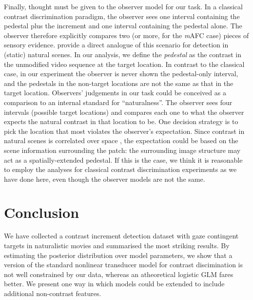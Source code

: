 \documentclass[11pt,a4paper]{article}
\begin{document}
{Finally, thought must be given to the observer model for our task.
In a classical contrast discrimination paradigm, the observer sees one interval containing the pedestal plus the increment and one interval containing the pedestal alone.
The observer therefore explicitly compares two (or more, for the \textit{m}AFC case) pieces of sensory evidence.
\citet{Bex2007} provide a direct analogue of this scenario for detection in (static) natural scenes.
In our analysis, we define the \textit{pedestal} as the contrast in the unmodified video sequence at the target location.
In contrast to the classical case, in our experiment the observer is never shown the pedestal-only interval, and the pedestals in the non-target locations are not the same as that in the target location.
Observers' judgements in our task could be conceived as a comparison to an internal standard for ``naturalness''. 
The observer sees four intervals (possible target locations) and compares each one to what the observer expects the natural contrast in that location to be.
One decision strategy is to pick the location that most violates the observer's expectation.
Since contrast in natural scenes is correlated over space \citep{Simo97,ZeBaWe93a,Tkacik2011}, the expectation could be based on the scene information surrounding the patch: the surrounding image structure may act as a spatially-extended pedestal.
If this is the case, we think it is reasonable to employ the analyses for classical contrast discrimination experiments as we have done here, even though the observer models are not the same.

\section{Conclusion}

We have collected a contrast increment detection dataset with gaze contingent targets in naturalistic movies and summarised the most striking results. 
By estimating the posterior distribution over model parameters, we show that a version of the standard nonlinear transducer model for contrast discimination is not well constrained by our data, whereas an atheoretical logistic GLM fares better.
We present one way in which models could be extended to include additional non-contrast features.

}
\end{document}
